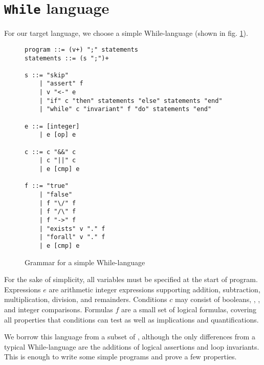 \section{\texttt{While} language} %

For our target language,
we choose a simple While-language (shown in fig. \ref{fig:whilegrammar}).
\begin{figure}[H]
    \begin{lstlisting}
program ::= (v+) ";" statements
statements ::= (s ";")+

s ::= "skip"
    | "assert" f
    | v "<-" e
    | "if" c "then" statements "else" statements "end"
    | "while" c "invariant" f "do" statements "end"

e ::= [integer]
    | e [op] e

c ::= c "&&" c
    | c "||" c
    | e [cmp] e

f ::= "true"
    | "false"
    | f "\/" f
    | f "/\" f
    | f "->" f
    | "exists" v "." f
    | "forall" v "." f
    | e [cmp] e \end{lstlisting}
    \caption{Grammar for a simple While-language\label{fig:whilegrammar}}
\end{figure}

For the sake of simplicity,
all variables must be specified at the start of program.
Expressions $e$ are arithmetic integer expressions
supporting addition, subtraction, multiplication, division, and remainders.
Conditions $c$ may consist of booleans, \inl{\&\&}, \inl{||}, and integer comparisons.
Formulas $f$ are a small set of logical formulas, covering all properties that conditions can test
as well as implications and quantifications.

We borrow this language from a subset of \cite{jlamp},
although the only differences from a typical While-language
are the additions of logical assertions and loop invariants.
This is enough to write some simple programs and prove a few properties.
